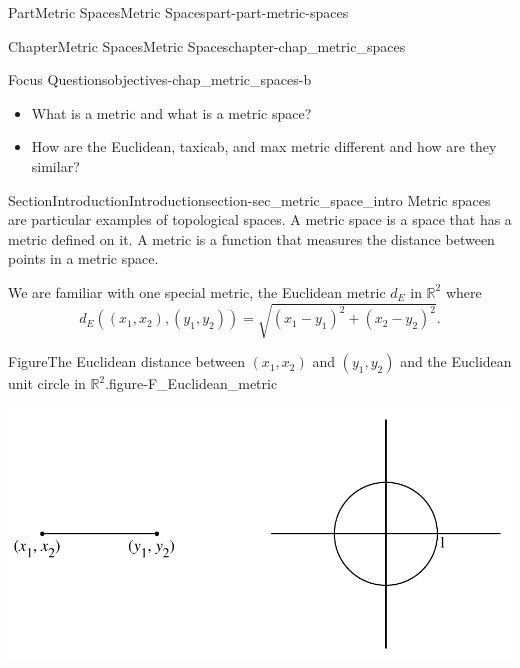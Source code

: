 \documentclass[oneside,10pt,]{book}
\numberwithin{equation}{chapter}
\newcommand{\R}{\mathbb{R}}
\begin{document}
\begin{partptx}{Part}{Metric Spaces}{}{Metric Spaces}{}{}{part-part-metric-spaces}
\renewcommand*{\partname}{Part}
%
\typeout{************************************************}
\typeout{************************************************}
%
\begin{chapterptx}{Chapter}{Metric Spaces}{}{Metric Spaces}{}{}{chapter-chap_metric_spaces}
\renewcommand*{\chaptername}{Chapter}
\begin{objectives}{Focus Questions}{objectives-chap_metric_spaces-b}
%
\begin{itemize}[label=\textbullet]
\item{}What is a metric and what is a metric space?%
\item{}How are the Euclidean, taxicab, and max metric different and how are they similar?%
\end{itemize}
\end{objectives}
%
%
\typeout{************************************************}
\typeout{************************************************}
%
\begin{sectionptx}{Section}{Introduction}{}{Introduction}{}{}{section-sec_metric_space_intro}
Metric spaces are particular examples of topological spaces. A metric space is a space that has a metric defined on it. A metric is a function that measures the distance between points in a metric space.%
\par
We are familiar with one special metric, the Euclidean metric \(d_E\) in \(\R^2\) where%
\begin{equation*}
d_E((x_1,x_2),(y_1,y_2)) = \sqrt{(x_1-y_1)^2 + (x_2-y_2)^2}\text{.}
\end{equation*}
%
\begin{figureptx}{Figure}{The Euclidean distance between \((x_1,x_2)\) and \((y_1,y_2)\) and the Euclidean unit circle in \(\R^2\).}{figure-F_Euclidean_metric}{}%
\begin{image}{0.125}{0.75}{0.125}{}%
\includegraphics[width=\linewidth]{external/Euclidean_metric.pdf}

\end{image}
\end{figureptx}
\end{sectionptx}
\end{chapterptx}
\end{partptx}
\end{document}
